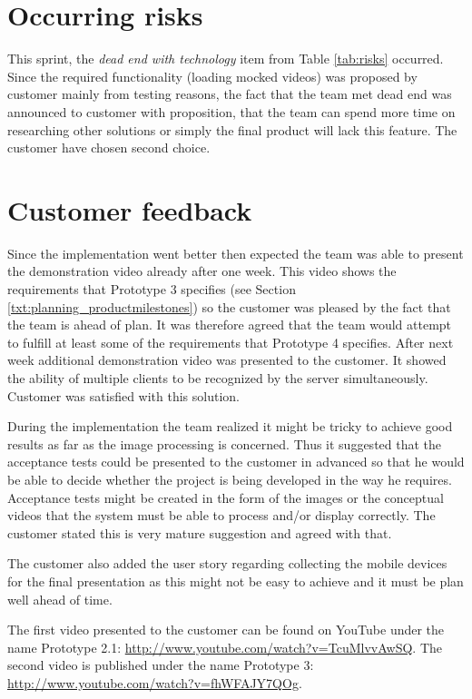 \section{Occurring risks}
This sprint, the \emph{dead end with technology} item from Table \ref{tab:risks} occurred. 
Since the required functionality (loading mocked videos) was proposed by customer mainly from testing reasons, the fact that the team met dead end was announced to customer with proposition, that the team can spend more time on researching other solutions or simply the final product will lack this feature.
The customer have chosen second choice.

\section{Customer feedback}
Since the implementation went better then expected the team was able to present the demonstration video already after one week. This video shows the requirements that Prototype 3 specifies (see Section \ref{txt:planning_productmilestones}) so the customer was pleased by the fact that the team is ahead of plan. It was therefore agreed that the team would attempt to fulfill at least some of the requirements that Prototype 4 specifies. After next week additional demonstration video was presented to the customer. It showed the ability of multiple clients to be recognized by the server simultaneously. Customer was satisfied with this solution.

During the implementation the team realized it might be tricky to achieve good results as far as the image processing is concerned. Thus it suggested that the acceptance tests could be presented to the customer in advanced so that he would be able to decide whether the project is being developed in the way he requires. Acceptance tests might be created in the form of the images or the conceptual videos that the system must be able to process and/or display correctly. The customer stated this is very mature suggestion and agreed with that.

The customer also added the user story regarding collecting the mobile devices for the final presentation as this might not be easy to achieve and it must be plan well ahead of time.

The first video presented to the customer can be found on YouTube under the name Prototype 2.1: \url{http://www.youtube.com/watch?v=TcuMlvvAwSQ}. The second video is published under the name Prototype 3: \url{http://www.youtube.com/watch?v=fhWFAJY7QOg}.

